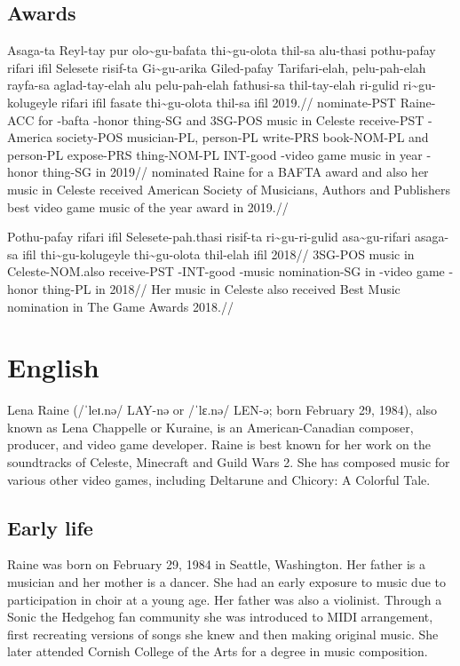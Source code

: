\subsection{Awards}

\ex
\begingl
\gla  Asaga-ta Reyl-tay pur olo\~{}gu-bafata thi\~{}gu-olota thil-sa alu-thasi pothu-pafay rifari ifil Selesete risif-ta Gi\~{}gu-arika Giled-pafay Tarifari-elah, pelu-pah-elah rayfa-sa aglad-tay-elah alu pelu-pah-elah fathusi-sa thil-tay-elah ri-gulid ri\~{}gu-kolugeyle rifari ifil fasate thi\~{}gu-olota thil-sa ifil 2019.//
\glb  nominate-PST Raine-ACC for \agradj{}-bafta \agradj{}-honor thing-SG and 3SG-POS music in Celeste receive-PST \agradj{}-America society-POS  musician-PL, person-PL write-PRS book-NOM-PL and person-PL expose-PRS thing-NOM-PL INT-good \agradj{}-video game music in year \agradj{}-honor thing-SG in 2019//
\glft nominated Raine for a BAFTA award and also her music in Celeste received American Society of Musicians, Authors and Publishers best video game music of the year award in 2019.//
\endgl
\xe

\ex
\begingl
\gla  Pothu-pafay rifari ifil Selesete-pah.thasi risif-ta ri\~{}gu-ri-gulid asa\~{}gu-rifari asaga-sa ifil  thi\~{}gu-kolugeyle thi\~{}gu-olota thil-elah ifil 2018//
\glb  3SG-POS music in Celeste-NOM.also receive-PST \agradj{}-INT-good \agradj{}-music nomination-SG in  \agradj{}-video game \agradj{}-honor thing-PL in 2018//
\glft Her music in Celeste also received Best Music nomination in The Game Awards 2018.//
\endgl
\xe

\newpage

\section{English}
Lena Raine (/ˈleɪ.nə/ LAY-nə or /ˈlɛ.nə/ LEN-ə; born February 29, 1984), also known as Lena Chappelle or Kuraine, is an American-Canadian composer, producer, and video game developer.
Raine is best known for her work on the soundtracks of Celeste, Minecraft and Guild Wars 2.
She has composed music for various other video games, including Deltarune and Chicory: A Colorful Tale.

\subsection{Early life}

Raine was born on February 29, 1984 in Seattle, Washington.
Her father is a musician and her mother is a dancer.
She had an early exposure to music due to participation in choir at a young age.
Her father was also a violinist.
Through a Sonic the Hedgehog fan community she was introduced to MIDI arrangement, first recreating versions of songs she knew and then making original music.
She later attended Cornish College of the Arts for a degree in music composition.

